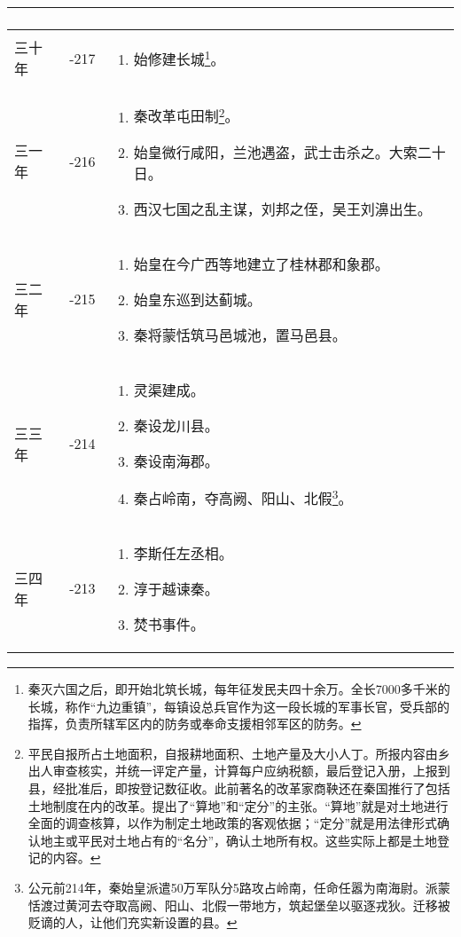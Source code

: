 \begin{longtable}{|>{\centering\scriptsize}m{2em}|>{\centering\scriptsize}m{1.3em}|>{\centering}m{8.8em}|}
\begin{enumerate}
  \end{enumerate} \tabularnewline\hline
  三十年 & -217 & \begin{enumerate}
    \tiny
  \item 始修建长城\footnote{秦灭六国之后，即开始北筑长城，每年征发民夫四十余万。全长7000多千米的长城，称作“九边重镇”，每镇设总兵官作为这一段长城的军事长官，受兵部的指挥，负责所辖军区内的防务或奉命支援相邻军区的防务。}。
  \end{enumerate} \tabularnewline\hline
  三一年 & -216 & \begin{enumerate}
    \tiny
  \item 秦改革屯田制\footnote{平民自报所占土地面积，自报耕地面积、土地产量及大小人丁。所报内容由乡出人审查核实，并统一评定产量，计算每户应纳税额，最后登记入册，上报到县，经批准后，即按登记数征收。此前著名的改革家商鞅还在秦国推行了包括土地制度在内的改革。提出了“算地”和“定分”的主张。“算地”就是对土地进行全面的调查核算，以作为制定土地政策的客观依据；“定分”就是用法律形式确认地主或平民对土地占有的“名分”，确认土地所有权。这些实际上都是土地登记的内容。}。
  \item 始皇微行咸阳，兰池遇盗，武士击杀之。大索二十日。
  \item 西汉七国之乱主谋，刘邦之侄，吴王刘濞出生。
  \end{enumerate} \tabularnewline\hline
  三二年 & -215 & \begin{enumerate}
    \tiny
  \item 始皇在今广西等地建立了桂林郡和象郡。
  \item 始皇东巡到达蓟城。
  \item 秦将蒙恬筑马邑城池，置马邑县。
  \end{enumerate} \tabularnewline\hline
  三三年 & -214 & \begin{enumerate}
    \tiny
  \item 灵渠建成。
  \item 秦设龙川县。
  \item 秦设南海郡。
  \item 秦占岭南，夺高阙、阳山、北假\footnote{公元前214年，秦始皇派遣50万军队分5路攻占岭南，任命任嚣为南海尉。派蒙恬渡过黄河去夺取高阙、阳山、北假一带地方，筑起堡垒以驱逐戎狄。迁移被贬谪的人，让他们充实新设置的县。}。
  \end{enumerate} \tabularnewline\hline
  三四年 & -213 & \begin{enumerate}
    \tiny
  \item 李斯任左丞相。
  \item 淳于越谏秦。
  \item 焚书事件。

\end{enumerate}
\end{longtable}
